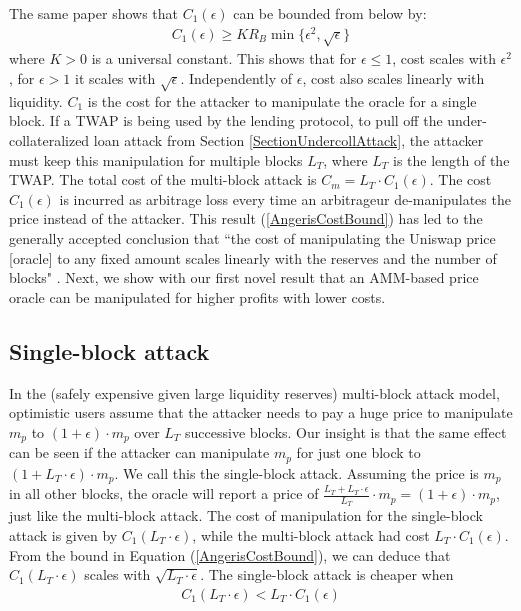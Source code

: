 \documentclass[conference]{IEEEtran}
\begin{document}
The same paper shows that $C_1(\epsilon)$ can be bounded from below by:
\begin{align}
    C_1(\epsilon) \geq K R_{B} \min\{\epsilon^2, \sqrt{\epsilon}\}
    \label{AngerisCostBound}
\end{align}
where $K > 0$ is a universal constant. This shows that for $\epsilon \leq 1$, cost scales with $\epsilon^2$, for $\epsilon > 1$ it scales with $\sqrt{\epsilon}$.
Independently of $\epsilon$, cost also scales linearly with liquidity. $C_1$ is the cost for the attacker to manipulate the oracle for a single block. If a TWAP is being used by the lending protocol, to pull off the under-collateralized loan attack from Section \ref{SectionUndercollAttack}, the attacker must keep this manipulation for multiple blocks $L_T$, where $L_T$ is the length of the TWAP. The total cost of the multi-block attack is $C_m = L_T \cdot C_1(\epsilon)$. The cost $C_1(\epsilon)$ is incurred as arbitrage loss every time an arbitrageur de-manipulates the price instead of the attacker. This result (\ref{AngerisCostBound}) has led to the generally accepted conclusion that ``the cost of manipulating the Uniswap price [oracle] to any fixed amount scales linearly with the reserves and the number of blocks" \cite{AngerisMedium}. Next, we show with our first novel result that an AMM-based price oracle can be manipulated for higher profits with lower costs.

\subsection{Single-block attack}
In the (safely expensive given large liquidity reserves) multi-block attack model, optimistic users assume that the attacker needs to pay a huge price to manipulate $m_p$ to $(1+\epsilon)\cdot m_p$ over $L_T$ successive blocks. Our insight is that the same effect can be seen if the attacker can manipulate $m_p$ for just one block to $(1 + L_T \cdot \epsilon) \cdot m_p$. We call this the single-block attack. Assuming the price is $m_p$ in all other blocks, the oracle will report a price of $\frac{ L_{T} + L_T \cdot \epsilon}{L_{T}}\cdot m_p = (1+\epsilon)\cdot m_p$, just like the multi-block attack. The cost of manipulation for the single-block attack is given by $C_1(L_T \cdot \epsilon)$, while the multi-block attack had cost $L_T \cdot C_1(\epsilon)$. From the bound in Equation (\ref{AngerisCostBound}), we can deduce that $C_1(L_T\cdot\epsilon)$ scales with $\sqrt{L_T\cdot\epsilon}$. The single-block attack is cheaper when
\begin{align*}
   C_1(L_T \cdot \epsilon) < L_T \cdot C_1(\epsilon)
\end{align*}
\end{document}
